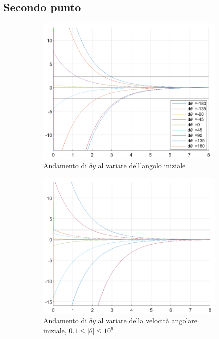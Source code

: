 \documentclass[a4paper, 11pt]{article}
\begin{document}
\subsection{Secondo punto}

\begin{figure}[h!]
	\centering
	\begin{subfigure}[b]{0.4\textwidth}
		\centering
		\includegraphics[width=\textwidth]{./images/theta_iniziali.png}
		\caption{Andamento di $\delta y$ al variare dell'angolo iniziale}
		\label{fig:theta_iniziali}
	\end{subfigure}
	\begin{subfigure}[b]{0.4\textwidth}
		\centering
		\includegraphics[width=\textwidth]{./images/omega_iniziali.png}
		\caption{Andamento di $\delta y$ al variare della velocità angolare iniziale, $0.1 \le \lvert\theta\rvert \le 10^6$}
		\label{fig:omega_iniziali}
	\end{subfigure}
	
	\caption{}
	\label{fig:stato_iniziale}
\end{figure}
\end{document}
